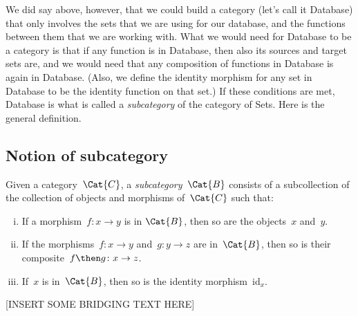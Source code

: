 
We did say above, however, that we could build a category (let's call it \textsf{Database}) that only involves the sets that we are using for our database, and the functions between them that we are working with. What we would need for \textsf{Database} to be a category is that if any function is in \textsf{Database}, then also its sources and target sets are, and we would need that any composition of functions in \textsf{Database} is again in \textsf{Database}. (Also, we define the identity morphism for any set in \textsf{Database} to be the identity function on that set.) If these conditions are met, \textsf{Database} is what is called a \emph{subcategory} of the category of Sets. Here is the general definition. 


\subsection{Notion of subcategory}

\begin{shaded*}
\begin{definition}[Subcategory]
\label{def:subcategory}
	Given a category~$\Cat{C}$, a \emph{subcategory}~$\Cat{B}$ consists of a subcollection of the collection of objects and morphisms of~$\Cat{C}$ such that:
	\begin{enumerate}[(i)]
	\item If a morphism~$f \colon x\to y$ is in $\Cat{B}$, then so are the objects~$x$ and~$y$.
	\item If the morphisms~$f\colon x\to y$ and~$g\colon y\to z$ are in~$\Cat{B}$, then so is their composite~$f\then g\colon x\to z$.
	\item If~$x$ is in~$\Cat{B}$, then so is the identity morphism~$\text{id}_x$.
	\end{enumerate}
\end{definition}
\end{shaded*}


[INSERT SOME BRIDGING TEXT HERE]


